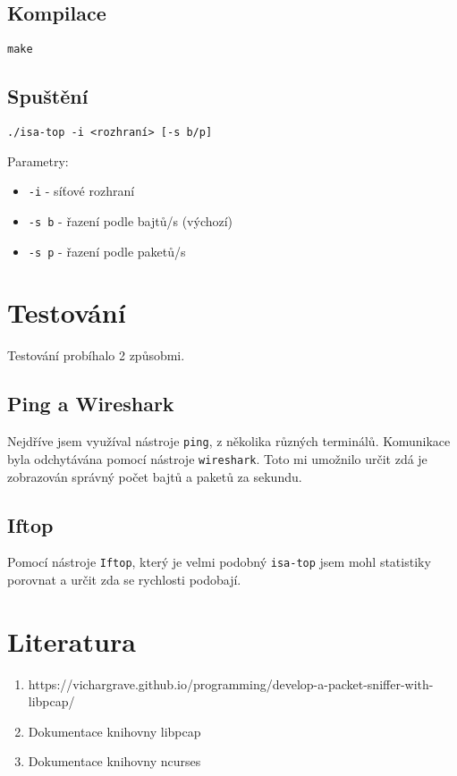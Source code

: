 \documentclass[a4paper,11pt]{article}
\theoremstyle{definition}
\begin{document}
\subsection{Kompilace}
\begin{verbatim}
make
\end{verbatim}

\subsection{Spuštění}
\begin{verbatim}
./isa-top -i <rozhraní> [-s b/p]
\end{verbatim}

Parametry:
\begin{itemize}
    \item \texttt{-i} - síťové rozhraní
    \item \texttt{-s b} - řazení podle bajtů/s (výchozí)
    \item \texttt{-s p} - řazení podle paketů/s
\end{itemize}

\section{Testování}
Testování probíhalo 2 způsobmi.
\subsection{Ping a Wireshark}
Nejdříve jsem využíval nástroje \texttt{ping}, z několika různých terminálů. Komunikace byla odchytávána pomocí nástroje \texttt{wireshark}.
Toto mi umožnilo určit zdá je zobrazován správný počet bajtů a paketů za sekundu.
\subsection{Iftop}
Pomocí nástroje \texttt{Iftop}, který je velmi podobný \texttt{isa-top} jsem mohl statistiky porovnat a určit zda se rychlosti podobají.

\section{Literatura}
\begin{enumerate}
    \item https://vichargrave.github.io/programming/develop-a-packet-sniffer-with-libpcap/
    \item Dokumentace knihovny libpcap
    \item Dokumentace knihovny ncurses
\end{enumerate}
\end{document}
